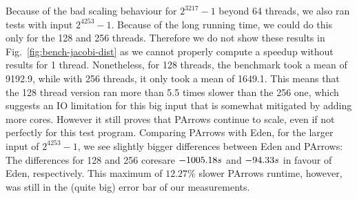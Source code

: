 Because of the bad scaling behaviour for $2^{3217}-1$ beyond 64 threads, we also ran tests with input $2^{4253}-1$. Because of the long running time, we could do this only for the 128 and 256 threads. Therefore we do not show these results in Fig.~\ref{fig:bench-jacobi-dist} as we cannot properly compute a speedup without results for 1 thread. Nonetheless, for 128 threads, the benchmark took a mean of 9192.9\seconds, while with 256 threads, it only took a mean of 1649.1\seconds. This means that the 128 thread version ran more than 5.5 times slower than the 256 one, which suggests an IO limitation for this big input that is somewhat mitigated by adding more cores. However it still proves that PArrows continue to scale, even if not perfectly for this test program.
Comparing PArrows with Eden, for the larger input of $2^{4253}-1$, we see slightly bigger differences between Eden and PArrows: The differences for 128 and 256 coresare $-1005.18s$ and $-94.33s$ in favour of Eden, respectively. This maximum of $12.27\%$ slower PArrows runtime, however, was still in the (quite big) error bar of our measurements.

\newcommand{\speedupJacobiDist}[5]{
\speedupplot{Speedup of \jacobitest \enquote{#2} vs simulated \enquote{#5}}{PArrows #2, simulated PArrows #5}{256}{#3}{
\addplot [mark=*,very thick,blue] table [scatter, x="nCores", y="speedup", col sep=comma, mark=none,
smooth]{benchmarks/distributed-jacobi/bench-jacobi.bench.jacobi-parr-#1-#2.csv};
}{#4}{\plotwidthDist}
}

\newcommand{\performanceJacobiDistDiff}[5]{
\performancediffplot{Run time differences\\for \jacobitest \enquote{#2}}{(Eden $-$ PArrows) #2}{256}{#3}{
\addplot+[mark=*,very thick,error bars/.cd,
    y dir=both,y explicit] table [x="nCores", y="time", y error="max stddev", col sep=comma, mark=dots,
smooth]{benchmarks/distributed-jacobi/#1-#2-diff.csv};
}{#4}{#5}{\plotwidthDist}
}

